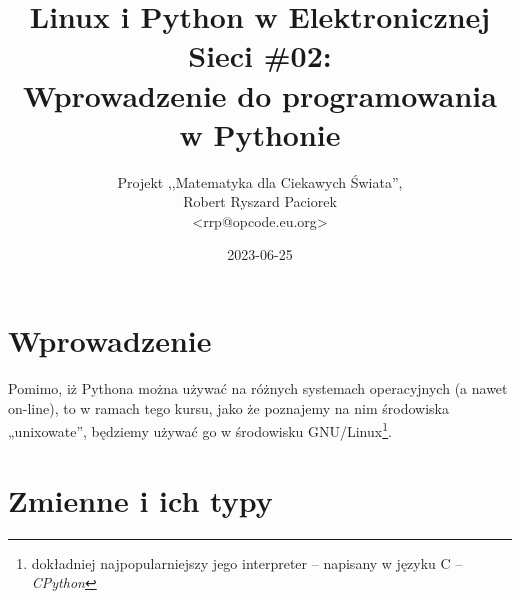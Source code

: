 \documentclass{pdfBooklets}
\title{Linux i Python w Elektronicznej Sieci \#02:\\ Wprowadzenie do programowania w Pythonie}
\author{%
	Projekt ,,Matematyka dla Ciekawych Świata'',\\
	Robert Ryszard Paciorek\\\normalsize\ttfamily <rrp@opcode.eu.org>
}
\date  {2023-06-25}
\begin{document}
\maketitle

\section{Wprowadzenie}



Pomimo, iż Pythona można używać na różnych systemach operacyjnych (a nawet on-line),
to w ramach tego kursu, jako że poznajemy na nim środowiska „unixowate”,
będziemy używać go w środowisku GNU/Linux\footnote{
	dokładniej najpopularniejszy jego interpreter – napisany w języku C – \textit{CPython}
}.






\section{Zmienne i ich typy}
	
	




\ZadaniaRozwiazaniaAuto[intro=booklets-sections/python/zadania-00-intro.tex]

\end{document}

